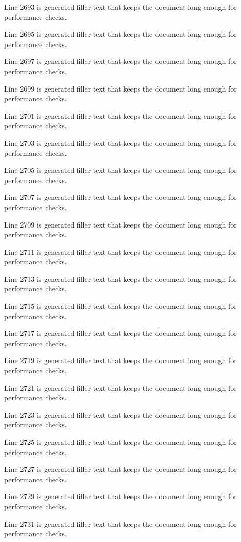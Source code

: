 Line 2693 is generated filler text that keeps the document long enough for performance checks.

Line 2695 is generated filler text that keeps the document long enough for performance checks.

Line 2697 is generated filler text that keeps the document long enough for performance checks.

Line 2699 is generated filler text that keeps the document long enough for performance checks.

Line 2701 is generated filler text that keeps the document long enough for performance checks.

Line 2703 is generated filler text that keeps the document long enough for performance checks.

Line 2705 is generated filler text that keeps the document long enough for performance checks.

Line 2707 is generated filler text that keeps the document long enough for performance checks.

Line 2709 is generated filler text that keeps the document long enough for performance checks.

Line 2711 is generated filler text that keeps the document long enough for performance checks.

Line 2713 is generated filler text that keeps the document long enough for performance checks.

Line 2715 is generated filler text that keeps the document long enough for performance checks.

Line 2717 is generated filler text that keeps the document long enough for performance checks.

Line 2719 is generated filler text that keeps the document long enough for performance checks.

Line 2721 is generated filler text that keeps the document long enough for performance checks.

Line 2723 is generated filler text that keeps the document long enough for performance checks.

Line 2725 is generated filler text that keeps the document long enough for performance checks.

Line 2727 is generated filler text that keeps the document long enough for performance checks.

Line 2729 is generated filler text that keeps the document long enough for performance checks.

Line 2731 is generated filler text that keeps the document long enough for performance checks.

